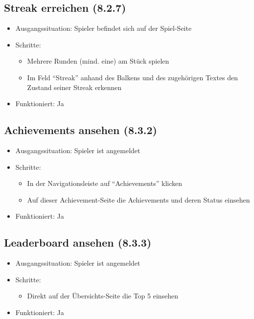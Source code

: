 \documentclass[a4paper]{scrreprt}
\begin{document}
            \subsection{Streak erreichen (8.2.7)}
            \begin{itemize}
                \item Ausgangssituation: Spieler befindet sich auf der Spiel-Seite
                \item Schritte:
                    \begin{itemize}
                        \item Mehrere Runden (mind. eine) am Stück spielen
                        \item Im Feld \enquote{Streak} anhand des Balkens und des zugehörigen Textes den Zustand seiner Streak erkennen
                    \end{itemize}
                    \item Funktioniert: Ja
            \end{itemize}

            \subsection{Achievements ansehen (8.3.2)}
            \begin{itemize}
                \item Ausgangssituation: Spieler ist angemeldet
                \item Schritte:
                    \begin{itemize}
                        \item In der Navigationsleiste auf \enquote{Achievements} klicken
                        \item Auf dieser Achievement-Seite die Achievements und deren Status einsehen
                    \end{itemize}
                \item Funktioniert: Ja
            \end{itemize}

            \subsection{Leaderboard ansehen (8.3.3)}
            \begin{itemize}
                \item Ausgangssituation: Spieler ist angemeldet
                \item Schritte:
                    \begin{itemize}
                        \item Direkt auf der Übersichts-Seite die Top 5 einsehen
                    \end{itemize}
                \item Funktioniert: Ja
            \end{itemize}
\end{document}
